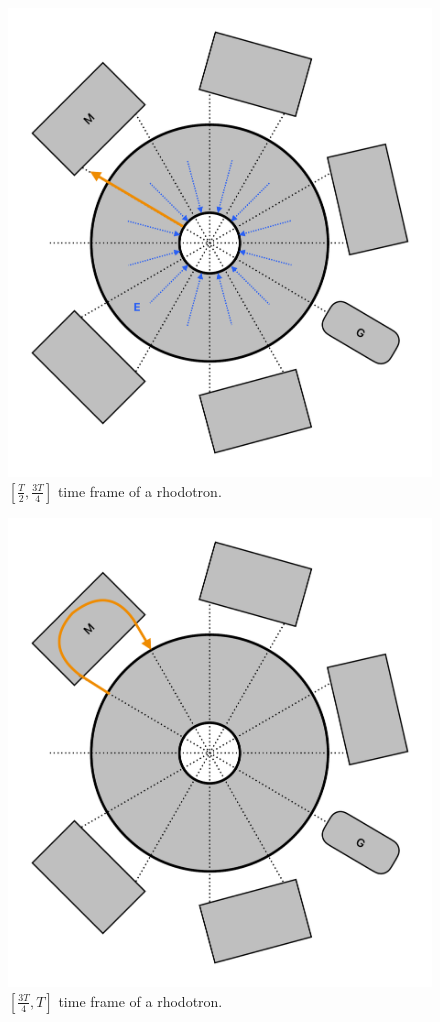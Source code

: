 \documentclass[a4paper,oneside,12pt]{report}
\numberwithin{equation}{chapter}
\begin{document}
\begin{figure}[H]
    \centering
    \includegraphics[width=\textwidth]{./figures/illustrations/rhod3.pdf}
    \caption{$[\frac{T}{2}, \frac{3T}{4}]$ time frame of a rhodotron.}
    \label{fig:rhod_cycle_3}
\end{figure}
\begin{figure}[H]
    \centering
    \includegraphics[width=\textwidth]{./figures/illustrations/rhod4.pdf}
    \caption{$[\frac{3T}{4}, T]$ time frame of a rhodotron.}
    \label{fig:rhod_cycle_4}
\end{figure}
\end{document}
